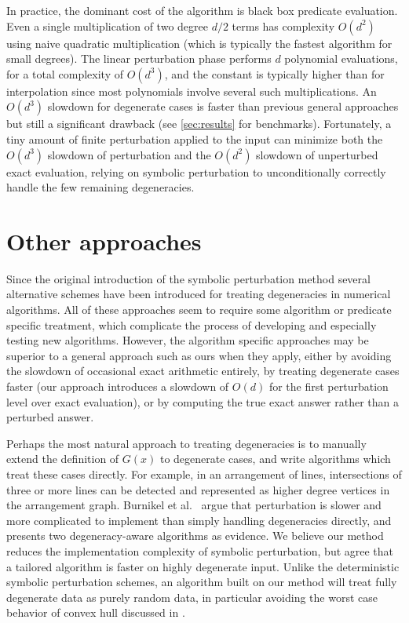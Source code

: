 \documentclass[11pt]{article}
\begin{document}
In practice, the dominant cost of the algorithm is black box predicate evaluation.  Even a single multiplication of two degree $d/2$ terms has complexity $O(d^2)$ using naive
quadratic multiplication (which is typically the fastest algorithm for small degrees).  The linear perturbation phase performs $d$ polynomial evaluations, for a total
complexity of $O(d^3)$, and the constant is typically higher than for interpolation since most polynomials involve several such multiplications.  An $O(d^3)$ slowdown for degenerate
cases is faster than previous general approaches but still a significant drawback (see \autoref{sec:results} for benchmarks).  Fortunately, a tiny amount of finite perturbation
applied to the input can minimize both the $O(d^3)$ slowdown of perturbation and the $O(d^2)$ slowdown of unperturbed exact evaluation, relying on symbolic perturbation to
unconditionally correctly handle the few remaining degeneracies.

\section{Other approaches}

Since the original introduction of the symbolic perturbation method several alternative schemes have been introduced for treating degeneracies in numerical algorithms.
All of these approaches seem to require some algorithm or predicate specific treatment, which complicate the process of developing and especially testing new algorithms.
However, the algorithm specific approaches may be superior to a general approach such as ours when they apply, either by avoiding the slowdown of occasional exact arithmetic
entirely, by treating degenerate cases faster (our approach introduces a slowdown of $O(d)$ for the first perturbation level over exact evaluation), or by computing the true exact
answer rather than a perturbed answer.

Perhaps the most natural approach to treating degeneracies is to manually extend the definition of $G(x)$ to degenerate cases, and write algorithms which treat these cases
directly.  For example, in an arrangement of lines, intersections of three or more lines can be detected and represented as higher degree vertices in the arrangement graph.
Burnikel et al.\ \cite{burnikel1994degeneracy} argue that perturbation is slower and more complicated to implement than simply handling degeneracies directly, and presents two degeneracy-aware
algorithms as evidence.  We believe our method reduces the implementation complexity of symbolic perturbation, but agree that a tailored algorithm is faster on highly
degenerate input.  Unlike the deterministic symbolic perturbation schemes, an algorithm built on our method will treat fully degenerate data as purely random data, in particular
avoiding the worst case behavior of convex hull discussed in \cite{burnikel1994degeneracy}.
\end{document}

